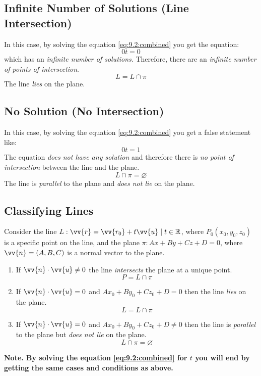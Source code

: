 \subsection{Infinite Number of Solutions (Line Intersection)}
	In this case, by solving the equation \eqref{eq:9.2:combined} you get the equation:
	\[0t = 0\]
	which has an \emph{infinite number of solutions}.
	Therefore, there are an \emph{infinite number of points of intersection}.
	\[L = L \cap \pi\]
	The line \emph{lies} on the plane.
\subsection{No Solution (No Intersection)}
	In this case, by solving the equation \eqref{eq:9.2:combined} you get a false statement like:
	\[0t = 1\]
	The equation \emph{does not have any solution} and therefore there is \emph{no point of intersection} between the line and the plane.
	\[L \cap \pi = \varnothing\]
	The line is \emph{parallel} to the plane and \emph{does not lie} on the plane.
\subsection{Classifying Lines}
	Consider the line $L: \vv{r} = \vv{r_0} + t\vv{u} \such t \in \real$, where $P_0(x_0,y_0,z_0)$ is a specific point on the line, and the plane $\pi: Ax + By + Cz + D = 0$, where $\vv{n} = (A, B, C)$ is a normal vector to the plane.
	\begin{enumerate}
		\item If $\vv{n} \cdot \vv{u} \neq 0$ the line \emph{intersects} the plane at a unique point. \[P = L \cap \pi\]
		\item If $\vv{n} \cdot \vv{u} = 0$ and $Ax_0 + By_0 + Cz_0 + D = 0$ then the line \emph{lies} on the plane. \[L = L \cap \pi\]
		\item If $\vv{n} \cdot \vv{u} = 0$ and $Ax_0 + By_0 + Cz_0 + D \neq 0$ then the line is \emph{parallel} to the plane but \emph{does not lie} on the plane. \[L \cap \pi = \varnothing\]
	\end{enumerate}
	\textbf{Note. By solving the equation \eqref{eq:9.2:combined} for $t$ you will end by getting the same cases and conditions as above.}

